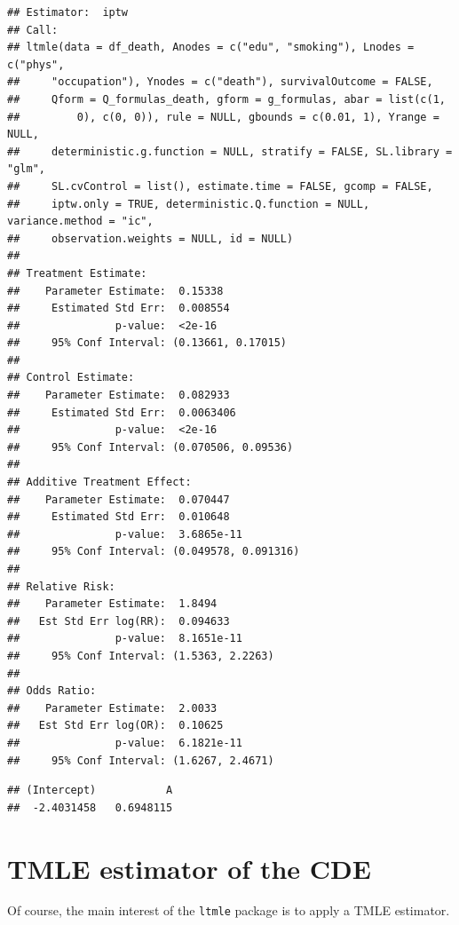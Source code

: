 \documentclass[
]{book}
\newenvironment{Shaded}{\begin{snugshade}}{\end{snugshade}}
\newcommand{\NormalTok}[1]{#1}
\newcommand{\SpecialCharTok}[1]{\textcolor[rgb]{0.81,0.36,0.00}{\textbf{#1}}}
\begin{document}
\begin{verbatim}
## Estimator:  iptw 
## Call:
## ltmle(data = df_death, Anodes = c("edu", "smoking"), Lnodes = c("phys", 
##     "occupation"), Ynodes = c("death"), survivalOutcome = FALSE, 
##     Qform = Q_formulas_death, gform = g_formulas, abar = list(c(1, 
##         0), c(0, 0)), rule = NULL, gbounds = c(0.01, 1), Yrange = NULL, 
##     deterministic.g.function = NULL, stratify = FALSE, SL.library = "glm", 
##     SL.cvControl = list(), estimate.time = FALSE, gcomp = FALSE, 
##     iptw.only = TRUE, deterministic.Q.function = NULL, variance.method = "ic", 
##     observation.weights = NULL, id = NULL)
## 
## Treatment Estimate:
##    Parameter Estimate:  0.15338 
##     Estimated Std Err:  0.008554 
##               p-value:  <2e-16 
##     95% Conf Interval: (0.13661, 0.17015) 
## 
## Control Estimate:
##    Parameter Estimate:  0.082933 
##     Estimated Std Err:  0.0063406 
##               p-value:  <2e-16 
##     95% Conf Interval: (0.070506, 0.09536) 
## 
## Additive Treatment Effect:
##    Parameter Estimate:  0.070447 
##     Estimated Std Err:  0.010648 
##               p-value:  3.6865e-11 
##     95% Conf Interval: (0.049578, 0.091316) 
## 
## Relative Risk:
##    Parameter Estimate:  1.8494 
##   Est Std Err log(RR):  0.094633 
##               p-value:  8.1651e-11 
##     95% Conf Interval: (1.5363, 2.2263) 
## 
## Odds Ratio:
##    Parameter Estimate:  2.0033 
##   Est Std Err log(OR):  0.10625 
##               p-value:  6.1821e-11 
##     95% Conf Interval: (1.6267, 2.4671)
\end{verbatim}

\begin{Shaded}
\end{Shaded}

\begin{verbatim}
## (Intercept)           A 
##  -2.4031458   0.6948115
\end{verbatim}

\section{TMLE estimator of the CDE}\label{tmle-estimator-of-the-cde}

Of course, the main interest of the \texttt{ltmle} package is to apply a TMLE estimator.
\end{document}
